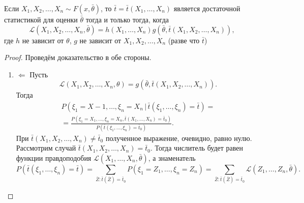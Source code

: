 \begin{theorem}
  Если $X_1, X_2, \dots, X_n \sim F(x, \bar\theta)$, то $\bar t = \bar t (X_1,
	\dots, X_n)$ является достаточной статистикой для оценки $\bar\theta$ тогда и
	только тогда, когда 
  \[
    \mathscr{L}(X_1, X_2, \dots, X_n, \bar\theta) = h(X_1, \dots, X_n)
		g(\bar\theta, \bar t (X_1, X_2, \dots, X_n)),
  \]
  где $h$ не зависит от $\theta$, $g$ не зависит от $X_1, X_2, \dots, X_n$
	(разве что $\bar t$)
\end{theorem}

\begin{proof}
	Проведём доказательство в обе стороны.
	\begin{enumerate}
		\item $\boxed{\Leftarrow}$ Пусть
			\[
				\mathscr L(X_1, X_2, \ldots, X_n, \theta) = g\left(\bar \theta, \bar t(X_1,
				X_2, \ldots, X_n) \right).
			\]
			Тогда
  \begin{multline*}
    P(\xi_1 = X-1, \dots, \xi_n = X_n \, | \, \bar t (\xi_1, \dots, \xi_n) = \bar t)
    = \\ = \frac{P(\xi_1=X_1, \dots, \xi_n = X_n, \bar t(X_1, \dots, X_n) = \bar
		t_0)}{P(\bar t(\xi_1, \dots, \xi_n) = \bar t_0)}.
  \end{multline*}
При $ \bar t(X_1, X_2, \ldots, X_n) \neq \bar t_0$ полученное выражение,
очевидно, равно нулю. Рассмотрим случай $ \bar t(X_1, X_2, \ldots, X_n) = \bar
t_0 $. Тогда числитель будет равен функции правдоподобия $ \mathscr L(X_1,
\ldots , X_n, \bar \theta) $, а знаменатель 
\[
		P(\bar t(\xi_1, \ldots, \xi_n) = \bar t) = \sum_{\bar Z \colon \bar t(\bar
		Z) = \bar t_0} P(\xi_1 = Z_1, \ldots, \xi_n = Z_n) = \sum_{\bar Z\colon \bar
		t(\bar Z) = \bar t_0}\mathscr L(Z_1, \ldots, Z_n, \bar \theta). 
\]


\end{enumerate}
\end{proof}
